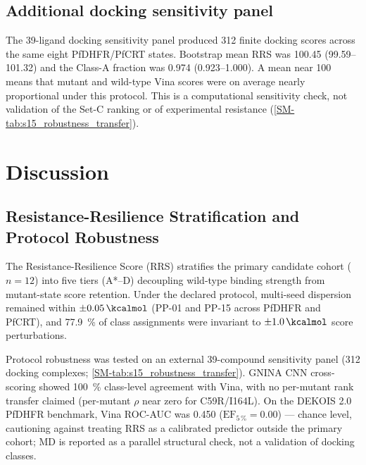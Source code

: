 \documentclass[journal=jcisd8,manuscript=article,layout=traditional]{achemso}
\begin{document}
\subsection{Additional docking sensitivity panel}

The 39-ligand docking sensitivity panel produced \num{312} finite docking scores across the same eight PfDHFR/PfCRT states. Bootstrap mean RRS was \num{100.45} (\numrange{99.59}{101.32}) and the Class-A fraction was \num{0.974} (\numrange{0.923}{1.000}). A mean near \num{100} means that mutant and wild-type Vina scores were on average nearly proportional under this protocol. This is a computational sensitivity check, not validation of the Set-C ranking or of experimental resistance (\cref{SM-tab:s15_robustness_transfer}).


\section{Discussion}

\subsection{Resistance-Resilience Stratification and Protocol Robustness}

The Resistance-Resilience Score (RRS) stratifies the primary candidate cohort ($n=\num{12}$) into five tiers (A*--D) decoupling wild-type binding strength from mutant-state score retention. Under the declared protocol, multi-seed dispersion remained within $\pm\qty{0.05}{\kcalmol}$ (PP-01 and PP-15 across PfDHFR and PfCRT), and \qty{77.9}{\percent} of class assignments were invariant to $\pm\qty{1.0}{\kcalmol}$ score perturbations.

Protocol robustness was tested on an external 39-compound sensitivity panel (\num{312} docking complexes; \cref{SM-tab:s15_robustness_transfer}). GNINA CNN cross-scoring showed \qty{100}{\percent} class-level agreement with Vina, with no per-mutant rank transfer claimed (per-mutant $\rho$ near zero for C59R/I164L). On the DEKOIS 2.0 PfDHFR benchmark, Vina ROC-AUC was \num{0.450} ($\mathrm{EF}_{5\,\%} = \num{0.00}$) — chance level, cautioning against treating RRS as a calibrated predictor outside the primary cohort; MD is reported as a parallel structural check, not a validation of docking classes.
\end{document}

